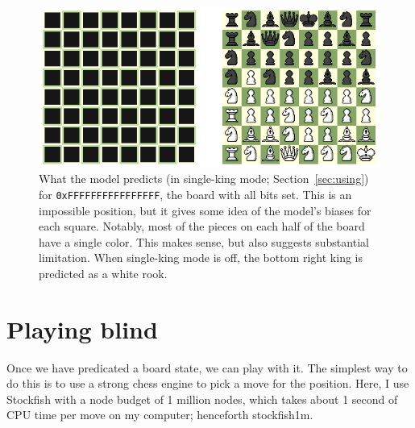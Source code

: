 \documentclass[twocolumn]{amsart}
\begin{document}
\begin{figure}[ht]
\includegraphics[width=0.9 \linewidth]{blind-allon}
\caption{What the model predicts (in single-king mode;
  Section~\ref{sec:using}) for {\tt 0xFFFFFFFFFFFFFFFF}, the board
  with all bits set. This is an impossible position, but it gives some
  idea of the model's biases for each square. Notably, most of the pieces
  on each half of the board have a single color. This makes sense, but
  also suggests substantial limitation. When single-king mode is off,
  the bottom right king is predicted as a white rook.} \label{fig:allon}
\end{figure}

\section{Playing blind}

Once we have predicated a board state, we can play with it. The
simplest way to do this is to use a strong chess engine to pick a move
for the position. Here, I use Stockfish with a node budget of 1
million nodes, which takes about 1 second of CPU time per move on my
computer; henceforth {\sf stockfish1m}.
\end{document}
